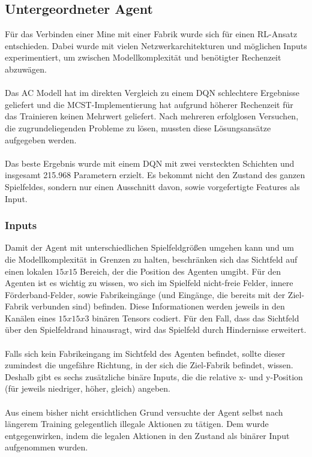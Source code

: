 \subsection{Untergeordneter Agent}
Für das Verbinden einer Mine mit einer Fabrik wurde sich für einen RL-Ansatz entschieden. Dabei wurde mit vielen Netzwerkarchitekturen und möglichen Inputs experimentiert, um zwischen Modellkomplexität und benötigter Rechenzeit abzuwägen. 
\\\\
Das AC Modell hat im direkten Vergleich zu einem DQN schlechtere Ergebnisse geliefert und die MCST-Implementierung hat aufgrund höherer Rechenzeit für das Trainieren keinen Mehrwert geliefert. Nach mehreren erfolglosen Versuchen, die zugrundeliegenden Probleme zu lösen, mussten diese Lösungsansätze aufgegeben werden.
\\\\
Das beste Ergebnis wurde mit einem DQN mit zwei versteckten Schichten und insgesamt 215.968 Parametern erzielt. Es bekommt nicht den Zustand des ganzen Spielfeldes, sondern nur einen Ausschnitt davon, sowie vorgefertigte Features als Input.
\subsubsection{Inputs}
Damit der Agent mit unterschiedlichen Spielfeldgrößen umgehen kann und um die Modellkomplexität in Grenzen zu halten, beschränken sich das Sichtfeld auf einen lokalen $15x15$ Bereich, der die Position des Agenten umgibt. 
Für den Agenten ist es wichtig zu wissen, wo sich im Spielfeld nicht-freie Felder, innere Förderband-Felder, sowie Fabrikeingänge (und Eingänge, die bereits mit der Ziel-Fabrik verbunden sind) befinden. Diese Informationen werden jeweils in den Kanälen eines  $15x15x3$ binären Tensors codiert. 
Für den Fall, dass das Sichtfeld über den Spielfeldrand hinausragt, wird das Spielfeld durch Hindernisse erweitert.
\\\\
Falls sich kein Fabrikeingang im Sichtfeld des Agenten befindet, sollte dieser zumindest die ungefähre Richtung, in der sich die Ziel-Fabrik befindet, wissen. Deshalb gibt es sechs zusätzliche binäre Inputs, die die relative x- und y-Position (für jeweils niedriger, höher, gleich) angeben.
\\\\
Aus einem bisher nicht ersichtlichen Grund versuchte der Agent selbst nach längerem Training gelegentlich illegale Aktionen zu tätigen. Dem wurde entgegenwirken, indem die legalen Aktionen in den Zustand als binärer Input aufgenommen wurden. 
